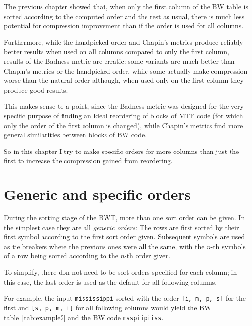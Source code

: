 \documentclass[a4paper]{scrreprt}
\begin{document}
The previous chapter showed that, when only the first column of the BW table is
sorted according to the computed order and the rest as usual, there is much less
potential for compression improvement than if the order is used for all columns.

Furthermore, while the handpicked order and Chapin's metrics produce reliably
better results when used on all columns compared to only the first column,
results of the Badness metric are erratic: some variants are much better than
Chapin's metrics or the handpicked order, while some actually make compression
worse than the natural order although, when used only on the first column they
produce good results.

This makes sense to a point, since the Badness metric was designed for the very
specific purpose of finding an ideal reordering of blocks of MTF code (for
which only the order of the first column is changed), while Chapin's metrics
find more general similarities between blocks of BW code.

So in this chapter I try to make specific orders for more columns than just the
first to increase the compression gained from reordering.

\section{Generic and specific orders}

During the sorting stage of the BWT, more than one sort order can be given. In
the simplest case they are all \emph{generic orders}: The rows are first sorted
by their first symbol according to the first sort order given. Subsequent
symbols are used as tie breakers where the previous ones were all the same, with
the \(n\)-th symbols of a row being sorted according to the \(n\)-th order
given.

To simplify, there don not need to be sort orders specified for each column; in
this case, the last order is used as the default for all following columns.

For example, the input \texttt{mississippi} sorted with the order \texttt{[i, m,
p, s]} for the first and \texttt{[s, p, m, i]} for all following columns would
yield the BW table~\ref{tab:example2} and the BW code \texttt{msspiipiiss}.
\end{document}
